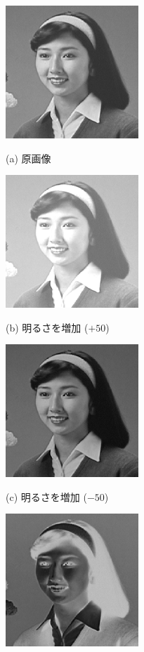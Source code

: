 \begin{figure}[H]
\begin{center}
\begin{minipage}{6cm}
\begin{center}
\includegraphics[width=5cm]{fig/hair1.eps}

(a) 原画像
\end{center}
\end{minipage}
\begin{minipage}{6cm}
\begin{center}
\includegraphics[width=5cm]{fig/hair1_p50.eps}

(b) 明るさを増加 ($+50$)
\end{center}
\end{minipage}
\begin{minipage}{6cm}
\begin{center}
\includegraphics[width=5cm]{fig/hair1_m50.eps}

(c) 明るさを増加 ($-50$)
\end{center}
\end{minipage}
\begin{minipage}{6cm}
\begin{center}
\includegraphics[width=5cm]{fig/hair1_np.eps}


\end{center}
\end{minipage}
\end{center}
\end{figure}
